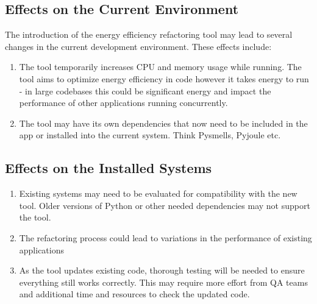\documentclass[12pt]{article}
\begin{document}
\subsection{Effects on the Current Environment}
The introduction of the energy efficiency refactoring tool may lead to several changes in the current development environment. These effects include:
\begin{enumerate}
  \item The tool temporarily increases CPU and memory usage while running. The tool aims to optimize energy efficiency in code however it takes energy to run - in large codebases this could be significant energy and impact the performance of other applications running concurrently. 
  \item The tool may have its own dependencies that now need to be included in the app or installed into the current system. Think Pysmells, Pyjoule etc.
\end{enumerate}

\subsection{Effects on the Installed Systems}
\begin{enumerate}
  \item Existing systems may need to be evaluated for compatibility with the new tool. Older versions of Python or other needed dependencies may not support the tool.
  \item The refactoring process could lead to variations in the performance of existing applications
  \item As the tool updates existing code, thorough testing will be needed to ensure everything still works correctly. This may require more effort from QA teams and additional time and resources to check the updated code.
\end{enumerate}
\end{document}
